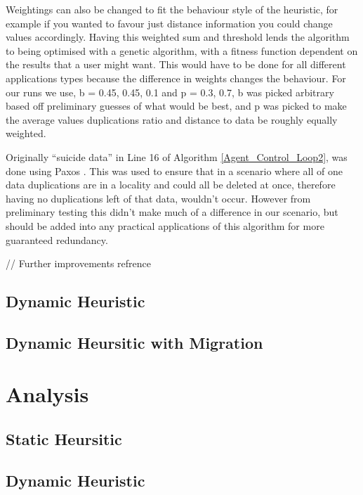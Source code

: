 \documentclass{UoYCSproject}
\begin{document}
Weightings can also be changed to fit the behaviour style of the heuristic, for example if you wanted to favour just distance information you could change values accordingly. 
Having this weighted sum and threshold lends the algorithm to being optimised with a genetic algorithm, with a fitness function dependent on the results that a user might want. 
This would have to be done for all different applications types because the difference in weights changes the behaviour. 
For our runs we use, b = {0.45, 0.45, 0.1} and p = {0.3, 0.7}, b was picked arbitrary based off preliminary guesses of what would be best, and p was picked to make the average values duplications ratio and distance to data be roughly equally weighted.

Originally “suicide data” in Line 16 of Algorithm \ref{Agent_Control_Loop2}, was done using Paxos \cite{Paxos}. 
This was used to ensure that in a scenario where all of one data duplications are in a locality and could all be deleted at once, therefore having no duplications left of that data, wouldn’t occur. 
However from preliminary testing this didn’t make much of a difference in our scenario, but should be added into any practical applications of this algorithm for more guaranteed redundancy. 

// Further improvements refrence


\section{Dynamic Heuristic}
\label{sec:Simple3}


\section{Dynamic Heursitic with Migration}
\label{sec:Simple4}



\chapter{Analysis}
\label{cha:Analysis}


\section{Static Heursitic}
\label{sec:Simple2a}


\section{Dynamic Heuristic}
\label{sec:Simple3a}
\end{document}
